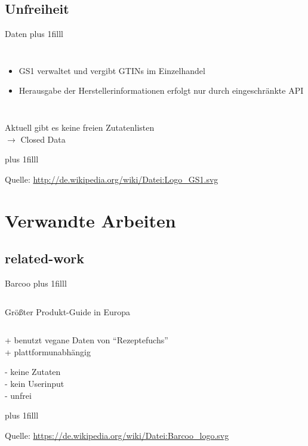 \documentclass{beamer}
\begin{document}
\subsection*{Unfreiheit}
\begin{frame}{Daten}
	\vskip0pt plus 1filll
	\begin{columns}[c]
			\begin{itemize}
				\item GS1 verwaltet und vergibt GTINs im Einzelhandel
				\item Herausgabe der Herstellerinformationen erfolgt nur durch eingeschränkte API
			\end{itemize}
			\centering
	\end{columns}

	\begin{alertblock}{}
		Aktuell gibt es keine freien Zutatenlisten\\
		$\rightarrow$ Closed Data
	\end{alertblock}

	\vskip0pt plus 1filll
	\par\hrulefill\par
	\tiny{Quelle:
	\url{http://de.wikipedia.org/wiki/Datei:Logo_GS1.svg}}
\end{frame}

\section{Verwandte Arbeiten}
\subsection*{related-work}
\begin{frame}{Barcoo}
	\vskip0pt plus 1filll
	\begin{columns}
			{\large Größter Produkt-Guide in Europa}
			\centering
	\end{columns}

	\begin{exampleblock}{}
		+ benutzt vegane Daten von ``Rezeptefuchs''\\
		+ plattformunabhängig
	\end{exampleblock}

	\begin{alertblock}{}
		- keine Zutaten\\
		- kein Userinput\\
		- unfrei
	\end{alertblock}

	\vskip0pt plus 1filll
	\par\hrulefill\par
	\tiny{Quelle:
	\url{https://de.wikipedia.org/wiki/Datei:Barcoo_logo.svg}}
\end{frame}
\end{document}
